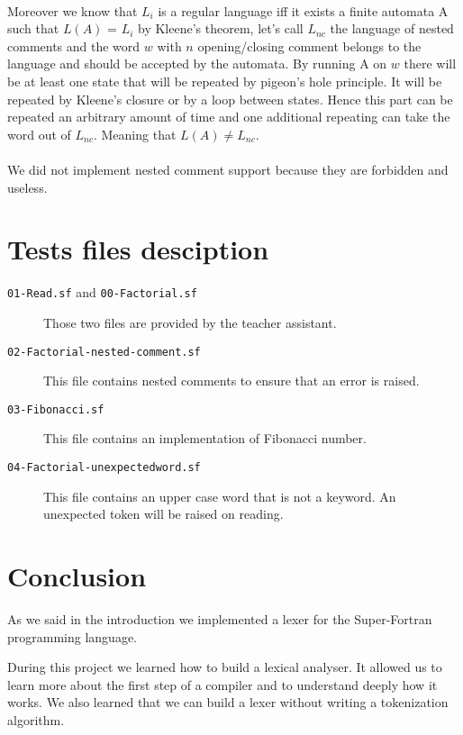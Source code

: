\documentclass[12pt]{article}
\begin{document}
\paragraph{}
Moreover we know that $L_i$ is a regular language iff it exists a finite automata A
such that $L(A)$ = $L_i$ by Kleene's theorem, let's call $L_{nc}$ the language
of nested comments and the word $w$ with $n$ opening/closing comment
belongs to the language and should be accepted by the automata. By running A on $w$
there will be at least one state that will be repeated by pigeon's hole principle.
It will be repeated by Kleene's closure or by a loop between states. Hence this part
can be repeated an arbitrary amount of time and one additional repeating can take the word out of $L_{nc}$. Meaning that $L(A) \neq L_{nc}$. 


\paragraph{}
We did not implement nested comment support because they are forbidden and useless.

\section{Tests files desciption}

\begin{description}
    \item[\texttt{01-Read.sf} and \texttt{00-Factorial.sf}] Those two files are provided by the teacher assistant.   
    \item[\texttt{02-Factorial-nested-comment.sf}] This file contains nested comments to ensure that an error is raised.
    \item[\texttt{03-Fibonacci.sf}] This file contains an implementation of Fibonacci number.
    \item[\texttt{04-Factorial-unexpectedword.sf}] This file contains an upper case word that is not a keyword. An unexpected token will be raised on reading.
\end{description}


\section{Conclusion}

As we said in the introduction we implemented a lexer for the Super-Fortran programming language.

During this project we learned how to build a lexical analyser.
It allowed us to learn more about the first step of a compiler and to understand deeply how it works.
We also learned that we can build a lexer without writing a tokenization algorithm.
\end{document}
